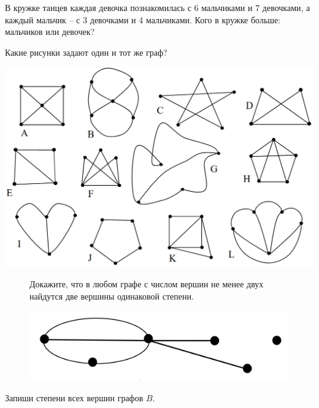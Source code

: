 
\begin{thm}
    В кружке танцев каждая девочка познакомилась с 6 мальчиками и 7 девочками, а каждый мальчик -- с 3 девочками и 4 мальчиками. Кого в кружке больше: мальчиков или девочек?
\end{thm}

\begin{thm}
    Какие рисунки задают один и тот же граф? 
\end{thm}

\includegraphics[width=0.95\columnwidth]{img/10.0.0 img1.png}

\begin{figure}[H]
\begin{minipage}{0.7\linewidth}
    \begin{thm}
        Докажите, что в любом графе с числом вершин не менее двух найдутся две вершины одинаковой степени.
    \end{thm}
\end{minipage}
    \hfill
\begin{minipage}{0.29\linewidth}
    \includegraphics[width=0.95\columnwidth]{img/10.0.0 img2.png}
\end{minipage}
\end{figure}

\begin{thm}
    Запиши степени всех вершин графов $B$.
\end{thm}

